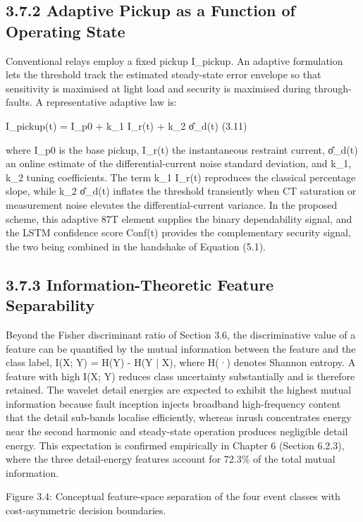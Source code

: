 \subsection{3.7.2  Adaptive Pickup as a Function of Operating State}
Conventional relays employ a fixed pickup I\_pickup. An adaptive formulation lets the threshold track the estimated steady-state error envelope so that sensitivity is maximised at light load and security is maximised during through-faults. A representative adaptive law is:

I\_pickup(t) = I\_p0 + k\_1 I\_r(t) + k\_2 σ̂\_d(t)	(3.11)

where I\_p0 is the base pickup, I\_r(t) the instantaneous restraint current, σ̂\_d(t) an online estimate of the differential-current noise standard deviation, and k\_1, k\_2 tuning coefficients. The term k\_1 I\_r(t) reproduces the classical percentage slope, while k\_2 σ̂\_d(t) inflates the threshold transiently when CT saturation or measurement noise elevates the differential-current variance. In the proposed scheme, this adaptive 87T element supplies the binary dependability signal, and the LSTM confidence score Conf(t) provides the complementary security signal, the two being combined in the handshake of Equation (5.1).


\subsection{3.7.3  Information-Theoretic Feature Separability}
Beyond the Fisher discriminant ratio of Section 3.6, the discriminative value of a feature can be quantified by the mutual information between the feature and the class label, I(X; Y) = H(Y) - H(Y | X), where H(·) denotes Shannon entropy. A feature with high I(X; Y) reduces class uncertainty substantially and is therefore retained. The wavelet detail energies are expected to exhibit the highest mutual information because fault inception injects broadband high-frequency content that the detail sub-bands localise efficiently, whereas inrush concentrates energy near the second harmonic and steady-state operation produces negligible detail energy. This expectation is confirmed empirically in Chapter 6 (Section 6.2.3), where the three detail-energy features account for 72.3\% of the total mutual information.

Figure 3.4: Conceptual feature-space separation of the four event classes with cost-asymmetric decision boundaries.


